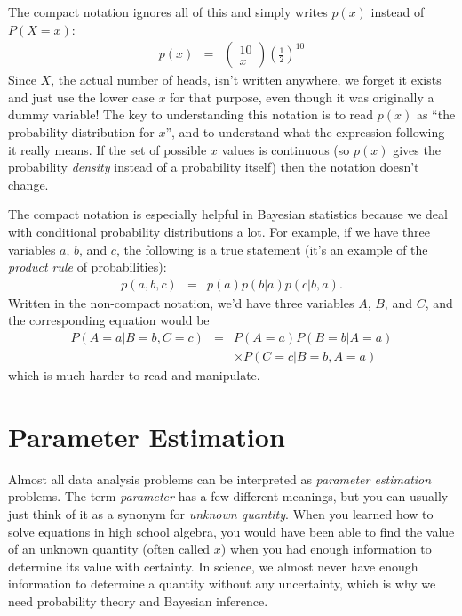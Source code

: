 The compact notation ignores all of this and simply writes $p(x)$ instead of
$P(X=x)$:
\begin{eqnarray}
p(x) &=& \left(\begin{array}{cc}10\\ x\end{array}\right)
\left(\frac{1}{2}\right)^{10}
\end{eqnarray}
Since $X$, the actual number of heads, isn't written anywhere, we forget it
exists and just use the lower case $x$ for that purpose, even though it was
originally a dummy variable!
The key to understanding this notation is to read $p(x)$ as ``the probability
distribution for $x$'', and to understand what the expression following it
really means. If the set of possible $x$ values is continuous (so $p(x)$ gives
the probability {\it density} instead of a probability itself) then the
notation doesn't change.

The compact notation is especially helpful in Bayesian statistics because
we deal with conditional probability distributions a lot. For example, if we
have three variables $a$, $b$, and $c$, the following is a true statement
(it's an example of the {\it product rule} of probabilities):
\begin{eqnarray}
p(a, b, c) &=& p(a)p(b|a)p(c|b,a).
\end{eqnarray}
Written in the non-compact notation, we'd have three variables $A$, $B$, and
$C$, and the corresponding equation would be
\begin{eqnarray}
P(A=a | B=b, C=c) &=&
 P(A=a)P(B=b|A=a)\\
& & \times P(C=c|B=b,A=a)
\end{eqnarray}
which is much harder to read and manipulate.

\section{Parameter Estimation}
Almost all data analysis problems can be interpreted as {\it parameter
estimation} problems. The term {\it parameter} has a few different meanings,
but you can usually just think of it as a synonym for {\it unknown quantity}.
When you learned how to solve equations in high school algebra,
you would have been able to find the value of an unknown quantity
(often called $x$) when you had
enough information to determine its value with certainty.
In science, we almost never have enough information to determine a quantity
without any uncertainty, which is why we need probability theory and Bayesian
inference.

